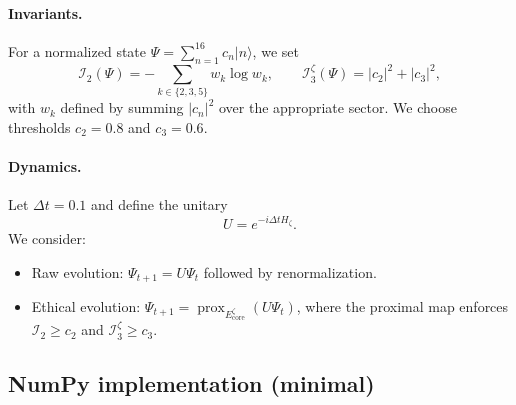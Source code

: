 \documentclass[11pt]{article}
\begin{document}
\paragraph{Invariants.}
For a normalized state $\Psi=\sum_{n=1}^{16} c_n|n\rangle$, we set
\[
  \mathcal{I}_2(\Psi) = -\sum_{k\in\{2,3,5\}} w_k\log w_k,\qquad
  \mathcal{I}_3^{\zeta}(\Psi) = |c_2|^2 + |c_3|^2,
\]
with $w_k$ defined by summing $|c_n|^2$ over the appropriate sector.
We choose thresholds $c_2=0.8$ and $c_3=0.6$.

\paragraph{Dynamics.}
Let $\Delta t = 0.1$ and define the unitary
\[
  U = e^{-i\Delta t H_\zeta}.
\]
We consider:
\begin{itemize}[leftmargin=*]
  \item Raw evolution: $\Psi_{t+1} = U\Psi_t$ followed by renormalization.
  \item Ethical evolution: $\Psi_{t+1} = \operatorname{prox}_{E_{\mathrm{core}}^{\zeta}}(U\Psi_t)$,
        where the proximal map enforces $\mathcal{I}_2\ge c_2$ and $\mathcal{I}_3^{\zeta}\ge c_3$.
\end{itemize}

\subsection{NumPy implementation (minimal)}
\end{document}
